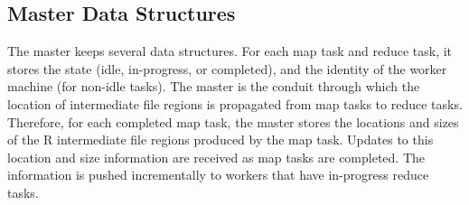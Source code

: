 \subsection {Master Data Structures}

The master keeps several data structures. For each map
task and reduce task, it stores the state (idle, in-progress,
or completed), and the identity of the worker machine
(for non-idle tasks).
The master is the conduit through which the location
of intermediate file regions is propagated from map tasks
to reduce tasks. Therefore, for each completed map task,
the master stores the locations and sizes of the R intermediate
file regions produced by the map task. Updates
to this location and size information are received as map
tasks are completed. The information is pushed incrementally
to workers that have in-progress reduce tasks.


